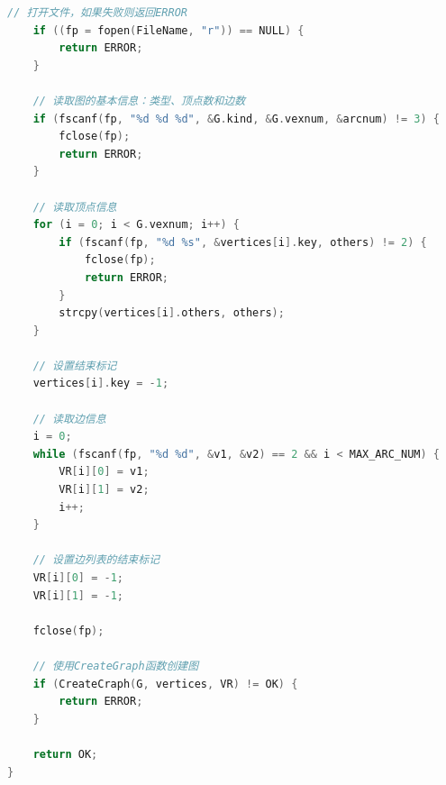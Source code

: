 \documentclass[supercite]{Experimental_Report}
\theoremstyle{definition}
\begin{document}
\begin{lstlisting}[language=C, caption={Graph-IO.h}, label=lst:graph_io_h]
    // 打开文件，如果失败则返回ERROR
    if ((fp = fopen(FileName, "r")) == NULL) {
        return ERROR;
    }
    
    // 读取图的基本信息：类型、顶点数和边数
    if (fscanf(fp, "%d %d %d", &G.kind, &G.vexnum, &arcnum) != 3) {
        fclose(fp);
        return ERROR;
    }
    
    // 读取顶点信息
    for (i = 0; i < G.vexnum; i++) {
        if (fscanf(fp, "%d %s", &vertices[i].key, others) != 2) {
            fclose(fp);
            return ERROR;
        }
        strcpy(vertices[i].others, others);
    }
    
    // 设置结束标记
    vertices[i].key = -1;
    
    // 读取边信息
    i = 0;
    while (fscanf(fp, "%d %d", &v1, &v2) == 2 && i < MAX_ARC_NUM) {
        VR[i][0] = v1;
        VR[i][1] = v2;
        i++;
    }
    
    // 设置边列表的结束标记
    VR[i][0] = -1;
    VR[i][1] = -1;
    
    fclose(fp);
    
    // 使用CreateGraph函数创建图
    if (CreateCraph(G, vertices, VR) != OK) {
        return ERROR;
    }
    
    return OK;
}
\end{lstlisting}
\end{document}

